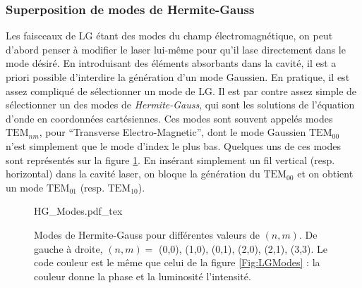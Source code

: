 \subsubsection{Superposition de modes de Hermite-Gauss}
\label{sec:hg_modes}
Les faisceaux de LG étant des modes du champ électromagnétique, on peut d'abord penser à modifier le laser lui-même pour qu'il lase directement dans le mode désiré. En introduisant des éléments absorbants dans la cavité, il est a priori possible d'interdire la génération d'un mode Gaussien. En pratique, il est assez compliqué de sélectionner un mode de LG. Il est par contre assez simple de sélectionner un des modes de \textit{Hermite-Gauss}, qui sont les solutions de l'équation d'onde en coordonnées cartésiennes. Ces modes sont souvent appelés modes $\mbox{TEM}_{nm}$, pour ``Transverse Electro-Magnetic'', dont le mode Gaussien $\mbox{TEM}_{00}$ n'est simplement que le mode d'index le plus bas. Quelques uns de ces modes sont représentés sur la figure \ref{Fig:hgmodes}. En insérant simplement un fil vertical (resp. horizontal) dans la cavité laser, on bloque la génération du $\mbox{TEM}_{00}$ et on obtient un mode $\mbox{TEM}_{01}$ (resp. $\mbox{TEM}_{10}$).

\begin{figure}[!ht]
\centering
\def\svgwidth{\columnwidth}
{HG_Modes.pdf_tex}
\caption{Modes de Hermite-Gauss pour différentes valeurs de $(n,m)$. De gauche à droite, $(n,m) =$ (0,0), (1,0), (0,1), (2,0), (2,1), (3,3). Le code couleur est le même que celui de la figure \ref{Fig:LGModes} : la couleur donne la phase et la luminosité l'intensité.}
\label{Fig:hgmodes}
\end{figure}

